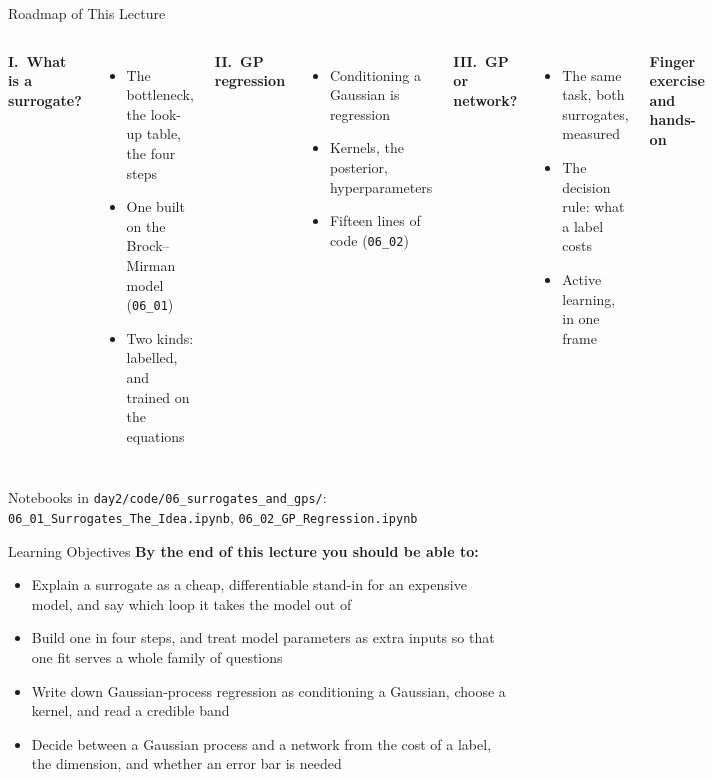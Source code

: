 \documentclass[aspectratio=169,11pt]{beamer}
\begin{document}
\begin{frame}{Roadmap of This Lecture}
\small
\begin{columns}[T]
\textbf{I.\ What is a surrogate?}
\begin{itemize}\setlength\itemsep{1pt}
    \item The bottleneck, the look-up table, the four steps
    \item One built on the Brock--Mirman model (\texttt{06\_01})
    \item Two kinds: labelled, and trained on the equations
\end{itemize}

\vspace{0.4em}
\textbf{II.\ GP regression}
\begin{itemize}\setlength\itemsep{1pt}
    \item Conditioning a Gaussian is regression
    \item Kernels, the posterior, hyperparameters
    \item Fifteen lines of code (\texttt{06\_02})
\end{itemize}

\textbf{III.\ GP or network?}
\begin{itemize}\setlength\itemsep{1pt}
    \item The same task, both surrogates, measured
    \item The decision rule: what a label costs
    \item Active learning, in one frame
\end{itemize}

\vspace{0.4em}
\textbf{Finger exercise and hands-on}
\end{columns}

\vspace{0.1em}
\begin{center}
{\scriptsize Notebooks in \texttt{day2/code/06\_surrogates\_and\_gps/}: \texttt{06\_01\_Surrogates\_The\_Idea.ipynb}, \texttt{06\_02\_GP\_Regression.ipynb}}
\end{center}
\end{frame}

\begin{frame}{Learning Objectives}
\textbf{By the end of this lecture you should be able to:}
\begin{itemize}\itemsep4pt
  \item Explain a surrogate as a cheap, differentiable stand-in for an expensive model, and say which loop it takes the model out of
  \item Build one in four steps, and treat model parameters as extra inputs so that one fit serves a whole family of questions
  \item Write down Gaussian-process regression as conditioning a Gaussian, choose a kernel, and read a credible band
  \item Decide between a Gaussian process and a network from the cost of a label, the dimension, and whether an error bar is needed
\end{itemize}
\end{frame}
\end{document}
